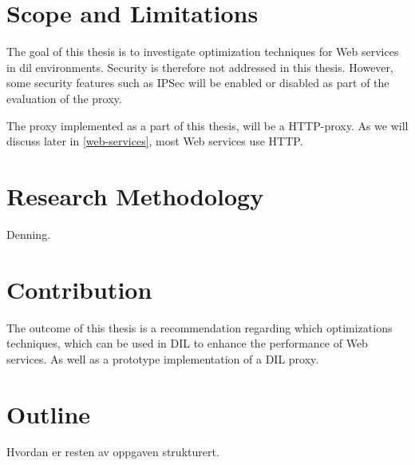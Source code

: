 \section{Scope and Limitations}

The goal of this thesis is to investigate optimization techniques for Web
services in \gls{dil} environments. Security is therefore not addressed in this
thesis. However, some security features such as IPSec will be enabled or
disabled as part of the evaluation of the proxy.

The proxy implemented as a part of this thesis, will be a HTTP-proxy. As we
will discuss later in \cref{web-services}, most Web services use HTTP.

\section{Research Methodology}
Denning.


\section{Contribution}

The outcome of this thesis is a recommendation regarding which optimizations
techniques, which can be used in DIL to enhance the performance of Web services.
As well as a prototype implementation of a DIL proxy.

\section{Outline}
Hvordan er resten av oppgaven strukturert.
